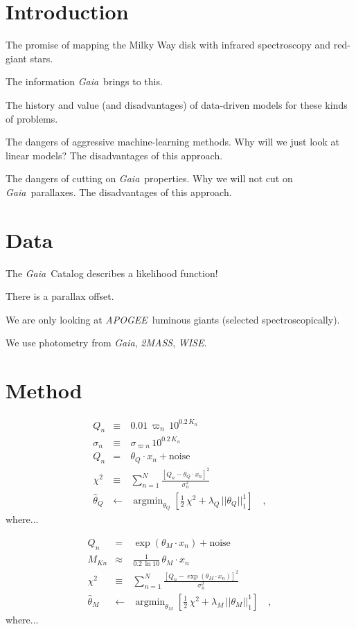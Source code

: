 \documentclass[modern]{aastex62}
\newcommand{\acronym}[1]{{\small{#1}}}
\newcommand{\project}[1]{\textsl{#1}}
\newcommand{\apogee}{\project{\acronym{APOGEE}}}
\newcommand{\gaia}{\project{Gaia}}
\newcommand{\wise}{\project{\acronym{WISE}}}
\newcommand{\zmass}{\project{\acronym{2MASS}}}
\DeclareMathOperator*{\argmin}{argmin}
\begin{document}

\section{Introduction} \label{sec:intro}

The promise of mapping the Milky Way disk with infrared spectroscopy
and red-giant stars.

The information \gaia\ brings to this.

The history and value (and disadvantages)
of data-driven models for these kinds of problems.

The dangers of aggressive machine-learning methods. Why will we just
look at linear models? The disadvantages of this approach.

The dangers of cutting on \gaia\ properties. Why we will not cut on
\gaia\ parallaxes. The disadvantages of this approach.

\section{Data}

The \gaia\ Catalog describes a likelihood function!

There is a parallax offset.

We are only looking at \apogee\ luminous giants (selected spectroscopically).

We use photometry from \gaia, \zmass, \wise.

\section{Method}

\begin{eqnarray}
Q_n &\equiv& 0.01\,\varpi_n\,10^{0.2\,K_n}
\\
\sigma_n &\equiv& \sigma_{\varpi n}\,10^{0.2\,K_n}
\\
Q_n &=& \theta_Q\cdot x_n + \mbox{noise}
\\
\chi^2 &\equiv& \sum_{n=1}^N \frac{[Q_n - \theta_Q\cdot x_n]^2}{\sigma_n^2}
\\
\hat{\theta}_Q &\leftarrow& \argmin_{\theta_Q}\left[\frac{1}{2}\,\chi^2 + \lambda_Q\,||\theta_Q||_1^1\right]
\quad ,
\end{eqnarray}
where...

\begin{eqnarray}
Q_n &=& \exp(\theta_M\cdot x_n) + \mbox{noise}
\\
M_{Kn} &\approx& \frac{1}{0.2\,\ln 10}\,\theta_M\cdot x_n
\\
\chi^2 &\equiv& \sum_{n=1}^N \frac{[Q_n - \exp(\theta_M\cdot x_n)]^2}{\sigma_n^2}
\\
\hat{\theta}_M &\leftarrow& \argmin_{\theta_M}\left[\frac{1}{2}\,\chi^2 + \lambda_M\,||\theta_M||_1^1\right]
\quad ,
\end{eqnarray}
where...
\end{document}

